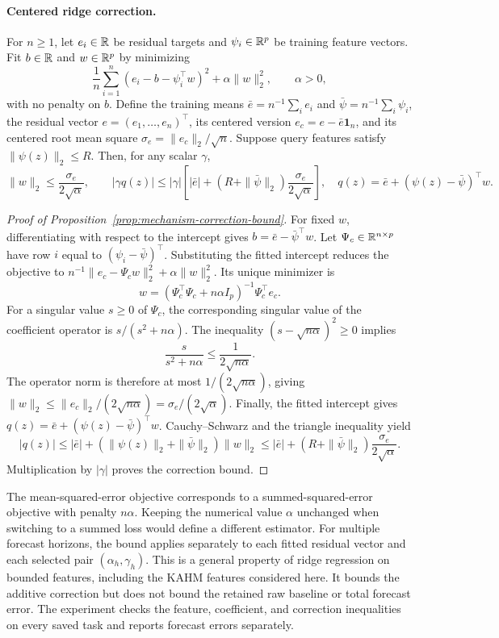 \paragraph{Centered ridge correction.}
For $n\geq1$, let $e_i\in\mathbb{R}$ be residual targets and
$\psi_i\in\mathbb{R}^p$ be training feature vectors. Fit $b\in\mathbb{R}$ and
$w\in\mathbb{R}^p$ by minimizing
\[
 \frac1n\sum_{i=1}^n(e_i-b-\psi_i^\top w)^2+\alpha\|w\|_2^2,
 \qquad\alpha>0,
\]
with no penalty on $b$. Define the training means
$\bar e=n^{-1}\sum_i e_i$ and
$\bar\psi=n^{-1}\sum_i\psi_i$, the residual vector
$e=(e_1,\ldots,e_n)^\top$, its centered version
$e_c=e-\bar e\mathbf1_n$, and its centered root mean square
$\sigma_e=\|e_c\|_2/\sqrt n$. Suppose query features satisfy
$\|\psi(z)\|_2\leq R$. Then, for any scalar $\gamma$,
\begin{equation}
 \|w\|_2\leq\frac{\sigma_e}{2\sqrt\alpha},\qquad
 |\gamma q(z)|\leq|\gamma|\left[
 |\bar e|+(R+\|\bar\psi\|_2)\frac{\sigma_e}{2\sqrt\alpha}\right],
 \quad q(z)=\bar e+(\psi(z)-\bar\psi)^\top w.
 \label{eq:mechanism-correction-bound}
\end{equation}
\begin{proof}[Proof of Proposition~\ref{prop:mechanism-correction-bound}]
For fixed $w$, differentiating with respect to the intercept gives
$b=\bar e-\bar\psi^\top w$. Let $\Psi_c\in\mathbb{R}^{n\times p}$ have
row $i$ equal to $(\psi_i-\bar\psi)^\top$. Substituting the fitted
intercept reduces the objective to
$n^{-1}\|e_c-\Psi_cw\|_2^2+\alpha\|w\|_2^2$.
Its unique minimizer is
\[
 w=(\Psi_c^\top\Psi_c+n\alpha I_p)^{-1}\Psi_c^\top e_c.
\]
For a singular value $s\geq0$ of $\Psi_c$, the corresponding singular
value of the coefficient operator is $s/(s^2+n\alpha)$. The inequality
$(s-\sqrt{n\alpha})^2\geq0$ implies
\[
 \frac{s}{s^2+n\alpha}\leq\frac{1}{2\sqrt{n\alpha}}.
\]
The operator norm is therefore at most $1/(2\sqrt{n\alpha})$, giving
$\|w\|_2\leq\|e_c\|_2/(2\sqrt{n\alpha})
=\sigma_e/(2\sqrt\alpha)$. Finally, the fitted intercept gives
$q(z)=\bar e+(\psi(z)-\bar\psi)^\top w$.
Cauchy--Schwarz and the triangle inequality yield
\[
 |q(z)|\leq|\bar e|+
 (\|\psi(z)\|_2+\|\bar\psi\|_2)\|w\|_2
 \leq|\bar e|+(R+\|\bar\psi\|_2)
 \frac{\sigma_e}{2\sqrt\alpha}.
\]
Multiplication by $|\gamma|$ proves the correction bound.
\end{proof}

The mean-squared-error objective corresponds to a summed-squared-error
objective with penalty $n\alpha$. Keeping the numerical value $\alpha$
unchanged when switching to a summed loss would define a different
estimator. For multiple forecast horizons, the bound applies separately
to each fitted residual vector and each selected pair
$(\alpha_h,\gamma_h)$. This is a general property of ridge regression
on bounded features, including the KAHM features considered here. It
bounds the additive correction but does not bound the retained raw
baseline or total forecast error. The experiment checks the feature,
coefficient, and correction inequalities on every saved task and reports
forecast errors separately.

